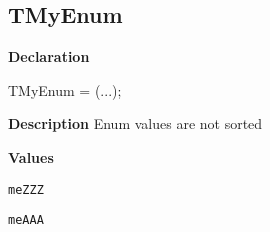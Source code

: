 \documentclass{report}
\newif\ifpdf
\begin{document}
\subsection*{TMyEnum}
\fi
\label{ok_no_sort-TMyEnum}
\begin{list}{}{
\setlength{\itemindent}{0cm}
\setlength{\listparindent}{0cm}
\setlength{\leftmargin}{\evensidemargin}
\addtolength{\leftmargin}{\tmplength}
\settowidth{\labelsep}{X}
\addtolength{\leftmargin}{\labelsep}
\setlength{\labelwidth}{\tmplength}
}
\item[\textbf{Declaration}\hfill]
\ifpdf
\begin{flushleft}
\fi
\begin{ttfamily}
TMyEnum = (...);\end{ttfamily}

\ifpdf
\end{flushleft}
\fi

\par
\item[\textbf{Description}]
Enum values are not sorted\item[\textbf{Values}]
\begin{description}
\item[\texttt{meZZZ}] \label{ok_no_sort-meZZZ}
\index{}
 
\item[\texttt{meAAA}] \label{ok_no_sort-meAAA}
\index{}
 
\end{description}


\end{list}
\end{document}
